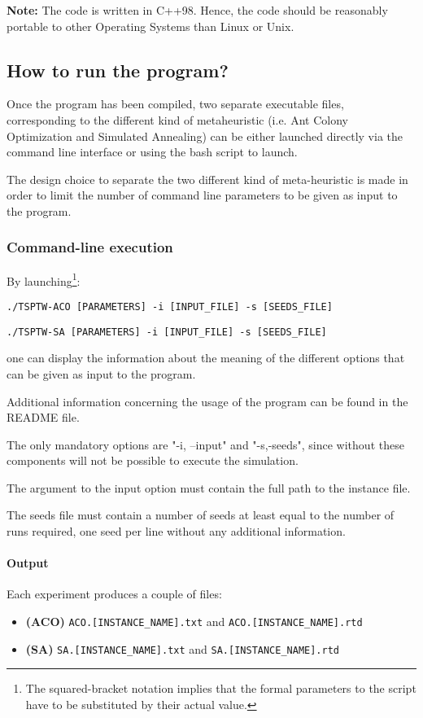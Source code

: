\documentclass{article}
\begin{document}
\textbf{Note:} The code is written in C++98. Hence, the code should be
reasonably portable to other Operating Systems than Linux or Unix.

\subsection{How to run the program?}

Once the program has been compiled, two separate executable files,
corresponding to the different kind of metaheuristic (i.e. Ant Colony Optimization
and Simulated Annealing) can be either launched directly via the command line
interface or using the bash script to launch.

The design choice to separate the two different kind of meta-heuristic is made in order to limit the number of command line parameters to be given as input to the program.

\subsubsection{Command-line execution}
By launching\footnote{The squared-bracket notation implies that the formal parameters to the script have to be substituted by their actual value.}:
\begin{center}
\begin{verbatim}
./TSPTW-ACO [PARAMETERS] -i [INPUT_FILE] -s [SEEDS_FILE]
\end{verbatim}
\begin{verbatim}
./TSPTW-SA [PARAMETERS] -i [INPUT_FILE] -s [SEEDS_FILE]
\end{verbatim}
\end{center}

one can display the information about the meaning of the different options that can be given as input to the program.

Additional information concerning the usage of the program can be found in the README file.

The only mandatory options are "-i, --input" and "-s,-seeds", since
without these components will not be possible to execute the simulation.

The argument to the input option must contain the full path to the instance file.

The seeds file must contain a number of seeds at least equal to the number of
runs required, one seed per line without any additional information.

\paragraph{Output}
Each experiment produces a couple of files:
\begin{itemize}
  \item \textbf{(ACO)} \verb|ACO.[INSTANCE_NAME].txt| and \verb|ACO.[INSTANCE_NAME].rtd|
  \item \textbf{(SA)} \verb|SA.[INSTANCE_NAME].txt| and \verb|SA.[INSTANCE_NAME].rtd|
\end{itemize} 
				
\end{document}
